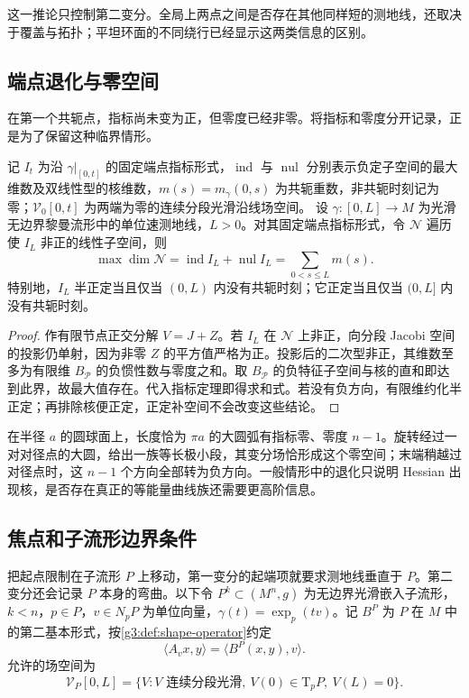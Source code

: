 这一推论只控制第二变分。全局上两点之间是否存在其他同样短的测地线，还取决于覆盖与拓扑；平坦环面的不同绕行已经显示这两类信息的区别。

\subsection{端点退化与零空间}
\label{g3:subsec:0604:04}

在第一个共轭点，指标尚未变为正，但零度已经非零。将指标和零度分开记录，正是为了保留这种临界情形。

\begin{proposition}\label{g3:prop:index-endpoint-nullity}
	记 \(I_t\) 为沿 \(\gamma|_{[0,t]}\) 的固定端点指标形式，\(\operatorname{ind}\) 与 \(\operatorname{nul}\) 分别表示负定子空间的最大维数及双线性型的核维数，\(m(s)=m_\gamma(0,s)\) 为共轭重数，非共轭时刻记为零；\(\mathcal V_0[0,t]\) 为两端为零的连续分段光滑沿线场空间。
	设 \(\gamma:[0,L]\to M\) 为光滑无边界黎曼流形中的单位速测地线，\(L>0\)。对其固定端点指标形式，令 \(\mathcal N\) 遍历使 \(I_L\) 非正的线性子空间，则
	\[
		\max\dim\mathcal N=\operatorname{ind}I_L+\operatorname{nul}I_L
		=\sum_{0<s\le L}m(s).
	\]
	特别地，\(I_L\) 半正定当且仅当 \((0,L)\) 内没有共轭时刻；它正定当且仅当 \((0,L]\) 内没有共轭时刻。
\end{proposition}
\begin{proof}
	作有限节点正交分解 \(V=J+Z\)。若 \(I_L\) 在 \(\mathcal N\) 上非正，向分段 Jacobi 空间的投影仍单射，因为非零 \(Z\) 的平方值严格为正。投影后的二次型非正，其维数至多为有限维 \(B_{\mathcal P}\) 的负惯性数与零度之和。取 \(B_{\mathcal P}\) 的负特征子空间与核的直和即达到此界，故最大值存在。代入指标定理即得求和式。若没有负方向，有限维约化半正定；再排除核便正定，正定补空间不会改变这些结论。
\end{proof}

在半径 \(a\) 的圆球面上，长度恰为 \(\pi a\) 的大圆弧有指标零、零度 \(n-1\)。旋转经过一对对径点的大圆，给出一族等长极小段，其变分场恰形成这个零空间；末端稍越过对径点时，这 \(n-1\) 个方向全部转为负方向。一般情形中的退化只说明 Hessian 出现核，是否存在真正的等能量曲线族还需要更高阶信息。

\subsection{焦点和子流形边界条件}
\label{g3:subsec:0604:05}

把起点限制在子流形 \(P\) 上移动，第一变分的起端项就要求测地线垂直于 \(P\)。第二变分还会记录 \(P\) 本身的弯曲。以下令 \(P^k\subset(M^n,g)\) 为无边界光滑嵌入子流形，\(k<n\)，\(p\in P\)，\(v\in N_pP\) 为单位向量，\(\gamma(t)=\exp_p(tv)\)。记 \(B^P\) 为 \(P\) 在 \(M\) 中的第二基本形式，按\cref{g3:def:shape-operator}约定
\[
	\langle A_vx,y\rangle=\langle B^P(x,y),v\rangle.
\]
允许的场空间为
\[
	\mathcal V_P[0,L]=\{V:V\text{ 连续分段光滑},\ V(0)\in\mathrm T_pP,\ V(L)=0\}.
\]

